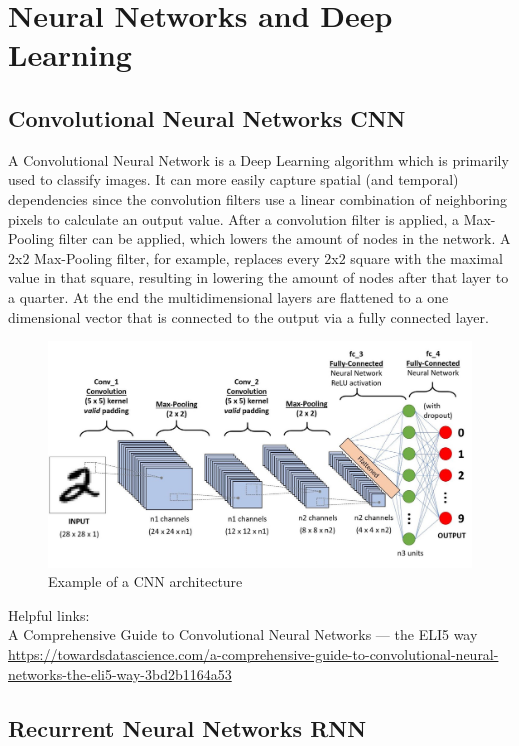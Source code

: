 \section{Neural Networks and Deep Learning}


\subsection{Convolutional Neural Networks CNN}

A Convolutional Neural Network is a Deep Learning algorithm which is primarily used to classify images. It can more easily capture spatial (and temporal) dependencies since the convolution filters use a linear combination of neighboring pixels to calculate an output value. After a convolution filter is applied, a Max-Pooling filter can be applied, which lowers the amount of nodes in the network. A $2$x$2$ Max-Pooling filter, for example, replaces every $2$x$2$ square with the maximal value in that square, resulting in lowering the amount of nodes after that layer to a quarter.
At the end the multidimensional layers are flattened to a one dimensional vector that is connected to the output via a fully connected layer.

\begin{figure}[hbtp]
	\centering
	\includegraphics[width=1\textwidth]{Images/CNN}
	\caption{Example of a CNN architecture}
\end{figure}

Helpful links:\\
A Comprehensive Guide to Convolutional Neural Networks — the ELI5 way
\\
\url{https://towardsdatascience.com/a-comprehensive-guide-to-convolutional-neural-networks-the-eli5-way-3bd2b1164a53}

\subsection{Recurrent Neural Networks RNN}

